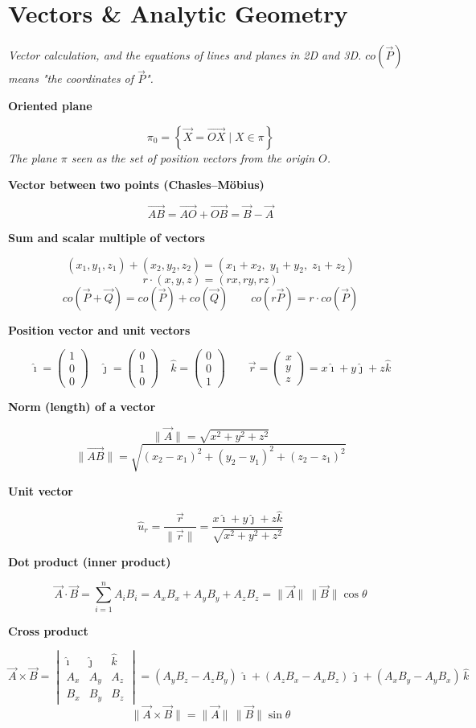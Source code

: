 \documentclass[11pt]{article}
\newcommand{\sect}[2]{\section*{\color{#1}#2}}
\newcommand{\sub}[1]{\par\medskip\textbf{#1}\par}
\newcommand{\expl}[1]{{\color{gray}\itshape #1}\par}
\begin{document}
\sect{cVec}{Vectors \& Analytic Geometry}
\expl{Vector calculation, and the equations of lines and planes in 2D and 3D. $co(\vec P)$ means "the coordinates of $\vec P$".}

\sub{Oriented plane}
\[ \pi_0 = \left\{ \vec X = \vec{OX} \mid X \in \pi \right\} \]
\expl{The plane $\pi$ seen as the set of position vectors from the origin $O$.}

\sub{Vector between two points (Chasles–Möbius)}
\[ \vec{AB} = \vec{AO} + \vec{OB} = \vec{B} - \vec{A} \]

\sub{Sum and scalar multiple of vectors}
\[ (x_1, y_1, z_1) + (x_2, y_2, z_2) = (x_1 + x_2,\; y_1 + y_2,\; z_1 + z_2) \]
\[ r\cdot(x, y, z) = (rx, ry, rz) \]
\[ co(\vec P + \vec Q) = co(\vec P) + co(\vec Q) \qquad co(r\vec P) = r\cdot co(\vec P) \]

\sub{Position vector and unit vectors}
\[ \hat\imath = \begin{pmatrix}1\\0\\0\end{pmatrix} \quad \hat\jmath = \begin{pmatrix}0\\1\\0\end{pmatrix} \quad \hat k = \begin{pmatrix}0\\0\\1\end{pmatrix} \qquad \vec r = \begin{pmatrix}x\\y\\z\end{pmatrix} = x\hat\imath + y\hat\jmath + z\hat k \]

\sub{Norm (length) of a vector}
\[ \|\vec A\| = \sqrt{x^2 + y^2 + z^2} \]
\[ \|\vec{AB}\| = \sqrt{(x_2 - x_1)^2 + (y_2 - y_1)^2 + (z_2 - z_1)^2} \]

\sub{Unit vector}
\[ \hat u_r = \frac{\vec r}{\|\vec r\|} = \frac{x\hat\imath + y\hat\jmath + z\hat k}{\sqrt{x^2 + y^2 + z^2}} \]

\sub{Dot product (inner product)}
\[ \vec A \cdot \vec B = \sum_{i=1}^{n} A_i B_i = A_x B_x + A_y B_y + A_z B_z = \|\vec A\|\,\|\vec B\|\cos\theta \]

\sub{Cross product}
\[ \vec A \times \vec B = \begin{vmatrix} \hat\imath & \hat\jmath & \hat k \\ A_x & A_y & A_z \\ B_x & B_y & B_z \end{vmatrix} = (A_yB_z - A_zB_y)\,\hat\imath + (A_zB_x - A_xB_z)\,\hat\jmath + (A_xB_y - A_yB_x)\,\hat k \]
\[ \|\vec A \times \vec B\| = \|\vec A\|\,\|\vec B\|\sin\theta \]
\end{document}
